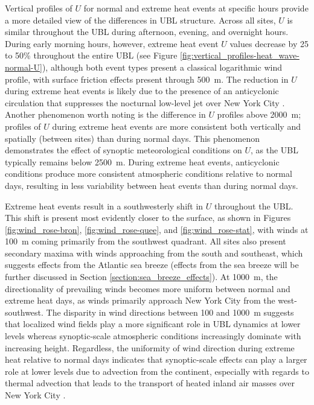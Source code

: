 Vertical profiles of $U$ for normal and extreme heat events at specific hours provide a more detailed view of the differences in UBL structure. Across all sites, $U$ is similar throughout the UBL during afternoon, evening, and overnight hours. During early morning hours, however, extreme heat event $U$ values decrease by 25 to 50\% throughout the entire UBL (see Figure \ref{fig:vertical_profiles-heat_wave-normal-U}), although both event types present a classical logarithmic wind profile, with surface friction effects present through \SI{500}{\meter}. The reduction in $U$ during extreme heat events is likely due to the presence of an anticyclonic circulation that suppresses the nocturnal low-level jet over New York City \citep{chen1993}. Another phenomenon worth noting is the difference in $U$ profiles above \SI{2000}{\meter}; profiles of $U$ during extreme heat events are more consistent both vertically and spatially (between sites) than during normal days. This phenomenon demonstrates the effect of synoptic meteorological conditions on $U$, as the UBL typically remains below \SI{2500}{\meter}. During extreme heat events, anticyclonic conditions produce more consistent atmospheric conditions relative to normal days, resulting in less variability between heat events than during normal days.

Extreme heat events result in a southwesterly shift in $U$ throughout the UBL. This shift is present most evidently closer to the surface, as shown in Figures \ref{fig:wind_rose-bron}, \ref{fig:wind_rose-quee}, and \ref{fig:wind_rose-stat}, with winds at \SI{100}{\meter} coming primarily from the southwest quadrant. All sites also present secondary maxima with winds approaching from the south and southeast, which suggests effects from the Atlantic sea breeze (effects from the sea breeze will be further discussed in Section \ref{section:sea_breeze_effects}). At \SI{1000}{\meter}, the directionality of prevailing winds becomes more uniform between normal and extreme heat days, as winds primarily approach New York City from the west-southwest. The disparity in wind directions between 100 and \SI{1000}{\meter} suggests that localized wind fields play a more significant role in UBL dynamics at lower levels whereas synoptic-scale atmospheric conditions increasingly dominate with increasing height. Regardless, the uniformity of wind direction during extreme heat relative to normal days indicates that synoptic-scale effects can play a larger role at lower levels due to advection from the continent, especially with regards to thermal advection that leads to the transport of heated inland air masses over New York City \citep{jiang2019, ramamurthy2017b}.

